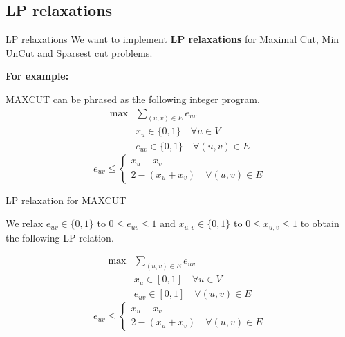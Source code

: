 \documentclass[10pt]{beamer}
\begin{document}
	\subsection{LP relaxations}
        \begin{frame}{LP relaxations}
            We want to implement \textbf{LP relaxations} for Maximal Cut, Min UnCut and Sparsest cut problems.
            
            \textbf{For example:} 
            
            MAXCUT can be phrased as the following integer program.
            \begin{align*}
                \max &\sum\limits_{(u,v) \in E} e_{uv} \\
                &x_u \in \{0,1\} \quad \forall u \in V\\
                &e_{uv} \in \{0,1\} \quad \forall (u,v) \in E
            \end{align*}
            \begin{equation*}
                e_{uv} \le 
                \begin{cases}
                    x_u + x_v \\
                    2 - (x_u + x_v) \quad \forall (u,v) \in E
                \end{cases}
            \end{equation*}
            
        \end{frame}  
        
        \begin{frame}{LP relaxation for MAXCUT}
        
        We relax $e_{uv} \in \{0, 1\}$ to $0 \le e_{uv} \le 1$ and $x_{u,v} \in \{0, 1\}$ to $0 \le x_{u,v} \le 1$ to obtain the following LP relation.
            
            \begin{align*}
                \max &\sum\limits_{(u,v) \in E} e_{uv} \\
                &x_u \in [0,1] \quad \forall u \in V\\
                &e_{uv} \in [0,1] \quad \forall (u,v) \in E
            \end{align*}
            \begin{equation*}
                e_{uv} \le 
                \begin{cases}
                    x_u + x_v \\
                    2 - (x_u + x_v) \quad \forall (u,v) \in E
                \end{cases}
            \end{equation*}
            
        \end{frame}   
        
\end{document}
